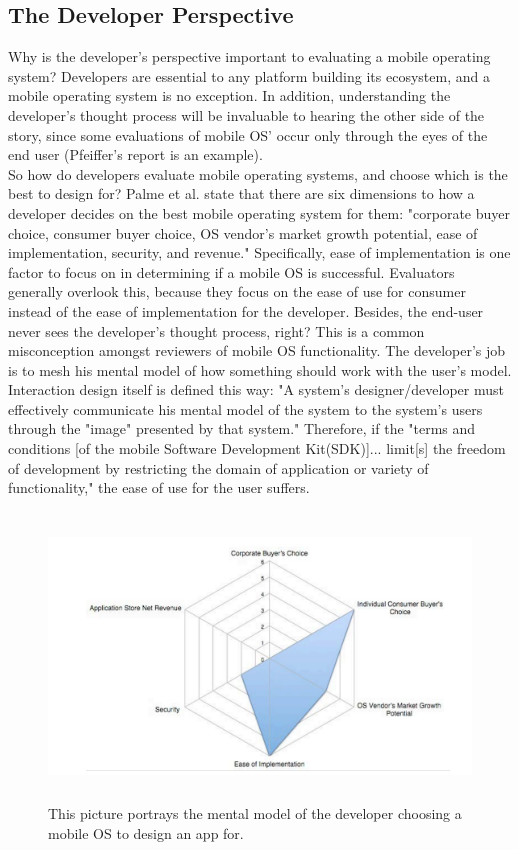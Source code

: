 \documentclass[11pt]{article}
\begin{document}
\subsection{The Developer Perspective}
Why is the developer's perspective important to evaluating a mobile operating system? Developers are essential to any platform building its ecosystem, and a mobile operating system is no exception. In addition, understanding the developer's thought process will be invaluable to hearing the other side of the story, since some evaluations of mobile OS' occur only through the eyes of the end user (Pfeiffer's report is an example). \\
\indent So how do developers evaluate mobile operating systems, and choose which is the best to design for? Palme et al. state that there are six dimensions to how a developer decides on the best mobile operating system for them: "corporate buyer choice, consumer buyer choice, OS vendor's market growth potential, ease of implementation, security, and revenue." \cite{Palme} Specifically, ease of implementation is one factor to focus on in determining if a mobile OS is successful. Evaluators generally overlook this, because they focus on the ease of use for consumer instead of the ease of implementation for the developer. Besides, the end-user never sees the developer's thought process, right? This is a common misconception amongst reviewers of mobile OS functionality. The developer's job is to mesh his mental model of how something should work with the user's model. Interaction design itself is defined this way: "A system's designer/developer must effectively communicate his mental model of the system to the system's users through the "image" presented by that system." Therefore, if the "terms and 
conditions [of the mobile Software Development Kit(SDK)]... limit[s] the freedom of development by restricting the domain of application or variety of functionality," the ease of use for the user suffers. \cite{Palme}
\begin{figure}[h]
\begin{center}
\includegraphics[height = 3in]{developerPerspective}
\caption{This picture portrays the mental model of the developer choosing a mobile OS to design an app for. \cite{Palme}}
\label{developerPerspective}
\end{center}
\end{figure} \\
\end{document}
